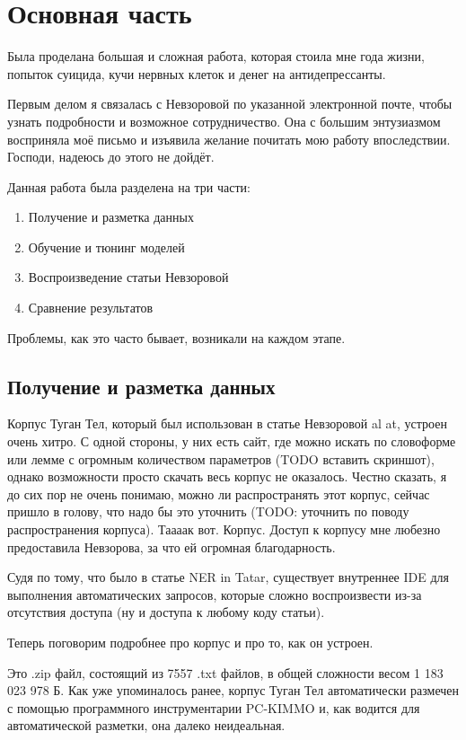 \section{Основная часть}

Была проделана большая и сложная работа, которая стоила мне года жизни, попыток суицида, кучи нервных клеток и денег на антидепрессанты.

Первым делом я связалась с Невзоровой по указанной электронной почте, чтобы узнать подробности и возможное сотрудничество. Она с большим энтузиазмом восприняла моё письмо и изъявила желание почитать мою работу впоследствии. Господи, надеюсь до этого не дойдёт.

Данная работа была разделена на три части: 

\begin{enumerate}
\item Получение и разметка данных
\item Обучение и тюнинг моделей
\item Воспроизведение статьи Невзоровой
\item Сравнение результатов
\end{enumerate}

Проблемы, как это часто бывает, возникали на каждом этапе.

\subsection{Получение и разметка данных}

Корпус Туган Тел, который был использован в статье Невзоровой al at, устроен очень хитро. С одной стороны, у них есть сайт, где можно искать по словоформе или лемме с огромным количеством параметров (TODO вставить скриншот), однако возможности просто скачать весь корпус не оказалось. Честно сказать, я до сих пор не очень понимаю, можно ли распространять этот корпус, сейчас пришло в голову, что надо бы это уточнить (TODO: уточнить по поводу распространения корпуса). Таааак вот. Корпус. Доступ к корпусу мне любезно предоставила Невзорова, за что ей огромная благодарность.

Судя по тому, что было в статье NER in Tatar, существует внутреннее IDE для выполнения автоматических запросов, которые сложно воспроизвести из-за отсутствия доступа (ну и доступа к любому коду статьи).

Теперь поговорим подробнее про корпус и про то, как он устроен.

Это .zip файл, состоящий из 7557 .txt файлов, в общей сложности весом 1 183 023 978 Б. Как уже упоминалось ранее, корпус Туган Тел автоматически размечен с помощью программного инструментарии PC-KIMMO и, как водится для автоматической разметки, она далеко неидеальная. 

